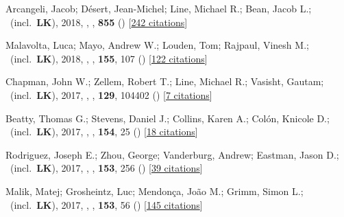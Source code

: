 \item[{\color{numcolor}\scriptsize18}] Arcangeli, Jacob; D{\'e}sert, Jean-Michel; Line, Michael R.; Bean, Jacob L.; \etal\ (incl.\ \textbf{LK}), 2018, , \apj, \textbf{855} () [\href{https://ui.adsabs.harvard.edu/abs/2018ApJ...855L..30A}{242 citations}]

\item[{\color{numcolor}\scriptsize17}] Malavolta, Luca; Mayo, Andrew W.; Louden, Tom; Rajpaul, Vinesh M.; \etal\ (incl.\ \textbf{LK}), 2018, , \aj, \textbf{155}, 107 () [\href{https://ui.adsabs.harvard.edu/abs/2018AJ....155..107M}{122 citations}]

\item[{\color{numcolor}\scriptsize16}] Chapman, John W.; Zellem, Robert T.; Line, Michael R.; Vasisht, Gautam; \etal\ (incl.\ \textbf{LK}), 2017, , \pasp, \textbf{129}, 104402 () [\href{https://ui.adsabs.harvard.edu/abs/2017PASP..129j4402C}{7 citations}]

\item[{\color{numcolor}\scriptsize15}] Beatty, Thomas G.; Stevens, Daniel J.; Collins, Karen A.; Col{\'o}n, Knicole D.; \etal\ (incl.\ \textbf{LK}), 2017, , \aj, \textbf{154}, 25 () [\href{https://ui.adsabs.harvard.edu/abs/2017AJ....154...25B}{18 citations}]

\item[{\color{numcolor}\scriptsize14}] Rodriguez, Joseph E.; Zhou, George; Vanderburg, Andrew; Eastman, Jason D.; \etal\ (incl.\ \textbf{LK}), 2017, , \aj, \textbf{153}, 256 () [\href{https://ui.adsabs.harvard.edu/abs/2017AJ....153..256R}{39 citations}]

\item[{\color{numcolor}\scriptsize13}] Malik, Matej; Grosheintz, Luc; Mendon{\c{c}}a, Jo{\~a}o M.; Grimm, Simon L.; \etal\ (incl.\ \textbf{LK}), 2017, , \aj, \textbf{153}, 56 () [\href{https://ui.adsabs.harvard.edu/abs/2017AJ....153...56M}{145 citations}]

